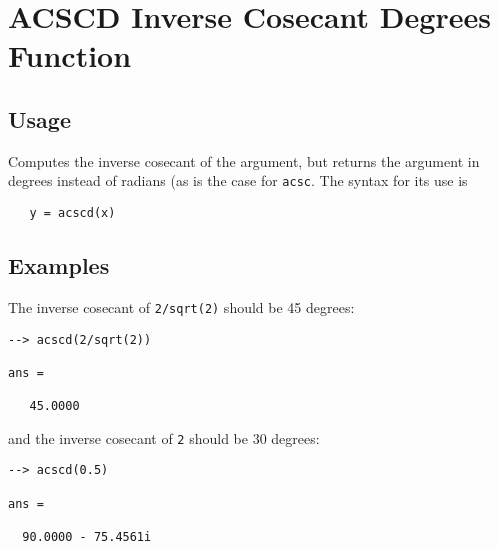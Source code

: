 \section{ACSCD Inverse Cosecant Degrees Function}

\subsection{Usage}

Computes the inverse cosecant of the argument, but returns
the argument in degrees instead of radians (as is the case
for \verb|acsc|. The syntax for its use is
\begin{verbatim}
   y = acscd(x)
\end{verbatim}
\subsection{Examples}

The inverse cosecant of \verb|2/sqrt(2)| should be 45 degrees:
\begin{verbatim}
--> acscd(2/sqrt(2))

ans = 

   45.0000 
\end{verbatim}
and the inverse cosecant of \verb|2| should be 30 degrees:
\begin{verbatim}
--> acscd(0.5)

ans = 

  90.0000 - 75.4561i 
\end{verbatim}
